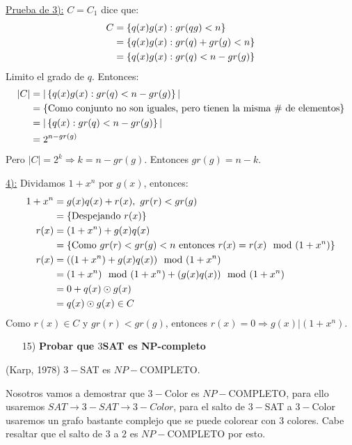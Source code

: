\documentclass[12pt,a4paper]{article}
\begin{document}
\underline{Prueba de 3):} $C = C_{1}$ dice que:
\begin{align*}
    C &= \left\lbrace q(x)g(x): gr(qg)<n \right\rbrace \\
    &= \left\lbrace q(x)g(x): gr(q)+gr(g)<n \right\rbrace \\
    &= \left\lbrace q(x)g(x): gr(q)<n-gr(g) \right\rbrace \\
\end{align*}
Limito el grado de $q$. Entonces:
\begin{align*}
    |C| &= |\left\lbrace q(x)g(x):gr(q) < n-gr(g) \right\rbrace|\\
    &= \left\lbrace \text{Como conjunto no son iguales, pero tienen la misma $\#$ de elementos} \right\rbrace\\
    &= |\left\lbrace q(x):gr(q)<n-gr(g) \right\rbrace|\\
    &= 2^{n-gr(g)}\\
\end{align*}
Pero $|C| = 2^{k} \Rightarrow k = n- gr(g)$. Entonces $gr(g) = n-k$.
\medskip

\underline{4):} Dividamos $1+x^{n}$ por $g(x)$, entonces:
\begin{align*}
    1+x^{n} &= g(x)q(x) + r(x),\,\, gr(r) < gr(g)\\
    &=\left\lbrace \text{Despejando $r(x)$} \right\rbrace\\
    r(x) &= (1+x^{n}) + g(x)q(x)\\
    &=\left\lbrace \text{Como $gr(r) < gr(g) < n$ entonces $r(x) = r(x) \mod (1+x^{n})$} \right\rbrace\\
    r(x) &= ((1+x^{n}) + g(x)q(x)) \mod (1+x^{n})\\
    &= (1+x^{n}) \mod (1+x^{n}) + (g(x)q(x)) \mod (1+x^{n})\\
    &= 0 + q(x) \odot g(x)\\
    &= q(x) \odot g(x) \in C
\end{align*}
Como $r(x) \in C$ y $gr(r) < gr(g)$, entonces $r(x) = 0 \Rightarrow g(x)|(1+x^{n})$.

\begin{itemize}
    \item [15)] \textbf{Probar que $3$SAT es NP-completo}
    \label{dem:3sat}
\end{itemize}

\begin{teorema} (Karp, 1978) $3-$SAT es $NP-$COMPLETO.
\end{teorema}

Nosotros vamos a demostrar que $3-$Color es $NP-$COMPLETO, para ello usaremos 
$SAT \to 3-SAT \to 3-Color$, para el salto de $3-$SAT a $3-$Color usaremos 
un grafo bastante complejo que se puede colorear con $3$ colores. Cabe resaltar 
que el salto de $3$ a $2$ es $NP-$COMPLETO por esto.
\medskip
\end{document}
